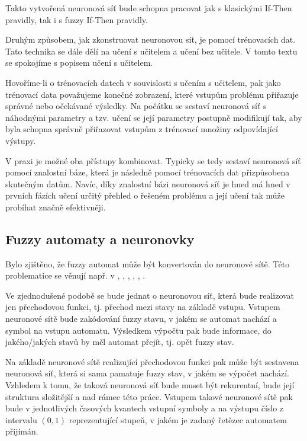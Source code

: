 \documentclass[a4paper,10pt]{article}
\begin{document}
Takto vytvořená neuronová síť bude schopna pracovat jak s klasickými If-Then pravidly, tak i s fuzzy If-Then pravidly.

Druhým způsobem, jak zkonstruovat neuronovou síť, je pomocí trénovacích dat. Tato technika se dále dělí na učení s učitelem a učení bez učitele. V tomto textu se spokojíme s popisem učení s učitelem.

Hovoříme-li o trénovacích datech v souvislosti s učením s učitelem, pak jako trénovací data považujeme konečné zobrazení, které vstupům problému přiřazuje správné nebo očekávané výsledky. Na počátku se sestaví neuronová síť s náhodnými parametry a tzv. učení se její parametry postupně modifikují tak, aby byla schopna správně přiřazovat vstupům z trénovací množiny odpovídající výstupy.


V praxi je možné oba přístupy kombinovat. Typicky se tedy sestaví neuronová síť pomocí znalostní báze, která je následně pomocí trénovacích dat přizpůsobena skutečným datům. Navíc, díky znalostní bázi neuronová síť je hned má hned v prvních fázích učení určitý přehled o řešeném problému a její učení tak může probíhat značně efektivněji. 

\subsection{Fuzzy automaty a neuronovky}
Bylo zjištěno, že fuzzy automat může být konvertován do neuronové sítě. Této problematice se věnují např. v \cite{DarAhmSin-AppFuzzAutTheKnBsNeuNetDevBasLeaMod}, \cite{OmlThoGil-FuzzFinStaAutCanDetEncIntRecNeuNet} \cite{BlaDelPeg-FuzzAutIndUsNeuNet}, \cite{GilOmlTho-EquKnoRep+}, \cite{OmlThoGil-RepFuzFinStaAuConRecNeuNet}, \cite{UnaKha-FuzDFinStaMachImpBasNeuFuzSys}, \cite{PedGac-LeaFuzzAut}.

Ve zjednodušené podobě se bude jednat o neuronovou síť, která bude realizovat jen přechodovou funkci, tj. přechod mezi stavy na základě vstupu. Vstupem neuronové sítě bude zakódování fuzzy stavu, v jakém se automat nachází a symbol na vstupu automatu. Výsledkem výpočtu pak bude informace, do jakého/jakých stavů by měl automat přejít, tj. opět fuzzy stav.

Na základě neuronové sítě realizující přechodovou funkci pak může být sestavena neuronová síť, která si sama pamatuje fuzzy stav, v jakém se výpočet nachází. Vzhledem k tomu, že taková neuronová síť bude muset být rekurentní, bude její struktura složitější a nad rámec této práce. Vstupem takové neuronové sítě pak bude v jednotlivých časových kvantech vstupní symboly a na výstupu číslo z intervalu $(0, 1)$ reprezentující stupeň, v jakém je zadaný řetězec automatem přijímán.
\end{document}
